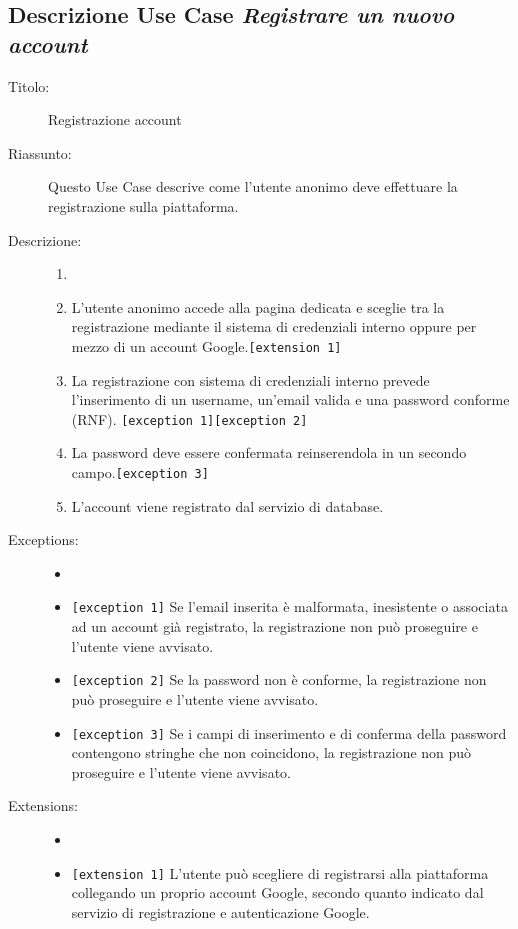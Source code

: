 \documentclass[11pt, a4paper]{article}
\theoremstyle{definition} %
\begin{document}
\subsection*{Descrizione Use Case \textit{Registrare un nuovo account}}
\begin{description}
    \item[Titolo:] Registrazione account
    
    \item[Riassunto:] Questo Use Case descrive come l'utente anonimo deve
    effettuare la registrazione sulla piattaforma.

    \item[Descrizione:]
    \begin{enumerate}
        \item[]
        \item L'utente anonimo accede alla pagina dedicata e sceglie tra la registrazione mediante il sistema di credenziali interno oppure per mezzo di un account Google.\texttt{[extension 1]}
        \item La registrazione con sistema di credenziali interno prevede l'inserimento di un username, un'email valida e una password conforme (RNF). \verb|[exception 1]|\verb|[exception 2]|
        \item La password deve essere confermata reinserendola in un secondo campo.\verb|[exception 3]|
        \item L'account viene registrato dal servizio di database.
    \end{enumerate}
    
    \item[Exceptions:]
    \begin{itemize}
        \item[]
        \item \verb|[exception 1]| Se l'email inserita è malformata, inesistente o associata ad un account già registrato, la registrazione non può proseguire e l'utente viene avvisato.
        \item \verb|[exception 2]| Se la password non è conforme, la registrazione non può proseguire e l'utente viene avvisato.
        \item \verb|[exception 3]| Se i campi di inserimento e di conferma della password contengono stringhe che non coincidono, la registrazione non può proseguire e l'utente viene avvisato.
    \end{itemize}

    \item[Extensions:]
    \begin{itemize}
        \item[]
        \item \texttt{[extension 1]} L'utente può scegliere di registrarsi alla piattaforma collegando un proprio account Google, secondo quanto indicato dal servizio di registrazione e autenticazione Google.
    \end{itemize}
\end{description}
\end{document}
